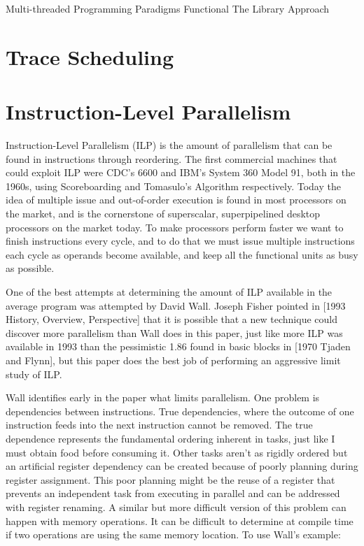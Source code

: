\documentclass[12pt,twoside,letterpaper]{article}
\begin{document}
Multi-threaded Programming Paradigms
Functional
The Library Approach

\section*{Trace Scheduling}

\section*{Instruction-Level Parallelism}
Instruction-Level Parallelism (ILP) is the amount of parallelism that can be found in instructions through reordering. The first commercial machines that could exploit ILP were CDC’s 6600 and IBM’s System 360 Model 91, both in the 1960s, using Scoreboarding and Tomasulo’s Algorithm respectively. Today the idea of multiple issue and out-of-order execution is found in most processors on the market, and is the cornerstone of superscalar, superpipelined desktop processors on the market today. To make processors perform faster we want to finish instructions every cycle, and to do that we must issue multiple instructions each cycle as operands become available, and keep all the functional units as busy as possible.

One of the best attempts at determining the amount of ILP available in the average program was attempted by David Wall. Joseph Fisher pointed in [1993 History, Overview, Perspective] that it is possible that a new technique could discover more parallelism than Wall does in this paper, just like more ILP was available in 1993 than the pessimistic 1.86 found in basic blocks in [1970 Tjaden and Flynn], but this paper does the best job of performing an aggressive limit study of ILP.

Wall identifies early in the paper what limits parallelism. One problem is dependencies between instructions. True dependencies, where the outcome of one instruction feeds into the next instruction cannot be removed. The true dependence represents the fundamental ordering inherent in tasks, just like I must obtain food before consuming it. Other tasks aren't as rigidly ordered but an artificial register dependency can be created because of poorly planning during register assignment. This poor planning might be the reuse of a register that prevents an independent task from executing in parallel and can be addressed with register renaming. A similar but more difficult version of this problem can happen with memory operations. It can be difficult to determine at compile time if two operations are using the same memory location. To use Wall’s example:
\end{document}
